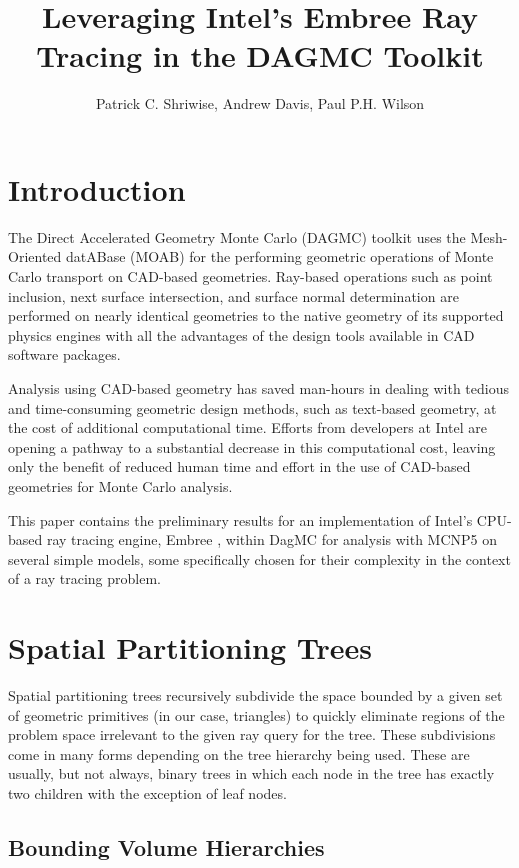 \documentclass{anstrans}
\title{Leveraging Intel's Embree Ray Tracing in the DAGMC Toolkit}
\author{Patrick C. Shriwise, Andrew Davis, Paul P.H. Wilson}
\institute{Department of Engineering Physics, University of Wisconsin-Madison, 1500 Engineering Dr, Madison, WI 53706, shriwise@wisc.edu}
\begin{document}
\section{Introduction}

The Direct Accelerated Geometry Monte Carlo (DAGMC) \cite{dagmc_2009} toolkit uses the Mesh-Oriented datABase (MOAB) \cite{moab} for the performing geometric operations of Monte Carlo transport on CAD-based geometries. Ray-based operations such as point inclusion, next surface intersection, and surface normal determination are performed on nearly identical geometries to the native geometry of its supported physics engines with all the advantages of the design tools available in CAD software packages.

Analysis using CAD-based geometry has saved man-hours in dealing with tedious and time-consuming geometric design methods, such as text-based geometry, at the cost of additional computational time. Efforts from developers at Intel are opening a pathway to a substantial decrease in this computational cost, leaving only the benefit of reduced human time and effort in the use of CAD-based geometries for Monte Carlo analysis. 

This paper contains the preliminary results for an implementation of Intel's CPU-based ray tracing engine, Embree \cite{embree}, within DagMC for analysis with MCNP5 \cite{mcnp5} on several simple models, some specifically chosen for their complexity in the context of a ray tracing problem.

\section{Spatial Partitioning Trees}

Spatial partitioning trees recursively subdivide the space bounded by a given set of geometric primitives (in our case, triangles) to quickly eliminate regions of the problem space irrelevant to the given ray query for the tree. These subdivisions come in many forms depending on the tree hierarchy being used. These are usually, but not always, binary trees in which each node in the tree has exactly two children with the exception of leaf nodes.

\subsection{Bounding Volume Hierarchies}
\end{document}
